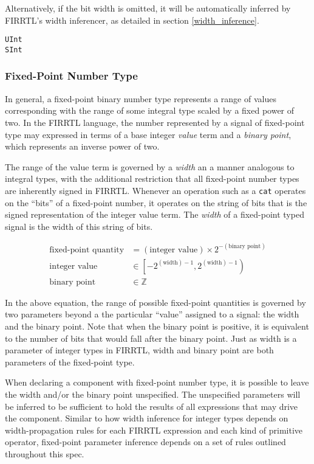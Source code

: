 \documentclass[12pt]{article}
\begin{document}
Alternatively, if the bit width is omitted, it will be automatically inferred by FIRRTL's width inferencer, as detailed in section \ref{width_inference}.

\begin{lstlisting}
UInt
SInt
\end{lstlisting}

\subsubsection{Fixed-Point Number Type}

In general, a fixed-point binary number type represents a range of values corresponding with the
range of some integral type scaled by a fixed power of two. In the FIRRTL language, the number
represented by a signal of fixed-point type may expressed in terms of a base integer \emph{value}
term and a \emph{binary point}, which represents an inverse power of two.

The range of the value term is governed by a \emph{width} an a manner analogous to integral types,
with the additional restriction that all fixed-point number types are inherently signed in FIRRTL.
Whenever an operation such as a \verb|cat| operates on the ``bits'' of a fixed-point number, it
operates on the string of bits that is the signed representation of the integer value term. The
\emph{width} of a fixed-point typed signal is the width of this string of bits.

\begin{align*}
  \text{fixed-point quantity} &= \left( \text{integer value} \right) \times 2^{-\left(\text{binary point}\right)}\\
  \text{integer value} &\in \left[ -2^{(\text{width})-1}, 2^{(\text{width})-1} \right)\\
  \text{binary point} &\in \mathbb{Z}
\end{align*}

In the above equation, the range of possible fixed-point quantities is governed by two parameters
beyond a the particular ``value'' assigned to a signal: the width and the binary point. Note that
when the binary point is positive, it is equivalent to the number of bits that would fall after the
binary point. Just as width is a parameter of integer types in FIRRTL, width and binary point are
both parameters of the fixed-point type.

When declaring a component with fixed-point number type, it is possible to leave the width and/or
the binary point unspecified. The unspecified parameters will be inferred to be sufficient to hold
the results of all expressions that may drive the component. Similar to how width inference for
integer types depends on width-propagation rules for each FIRRTL expression and each kind of
primitive operator, fixed-point parameter inference depends on a set of rules outlined throughout
this spec.
\end{document}
